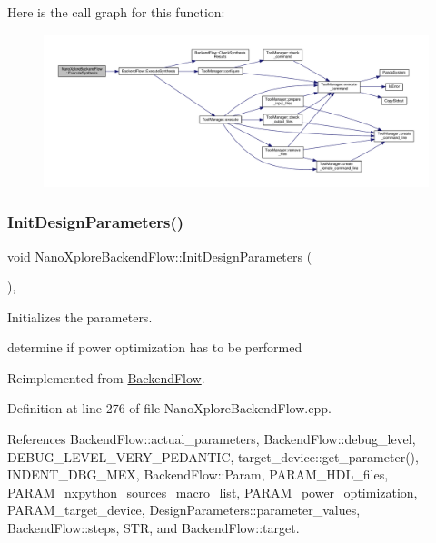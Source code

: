 Here is the call graph for this function\+:
\nopagebreak
\begin{figure}[H]
\begin{center}
\leavevmode
\includegraphics[width=350pt]{d3/d3c/classNanoXploreBackendFlow_a068c9327512c0a9f5524433ebb52fde7_cgraph}
\end{center}
\end{figure}
\mbox{\label{classNanoXploreBackendFlow_a56157c2264c3b823bb2a6cb5d1386d63}} 
\subsubsection{\texorpdfstring{Init\+Design\+Parameters()}{InitDesignParameters()}}
{\footnotesize\ttfamily void Nano\+Xplore\+Backend\+Flow\+::\+Init\+Design\+Parameters (\begin{DoxyParamCaption}{ }\end{DoxyParamCaption})\hspace{0.3cm}{\ttfamily [override]}, {\ttfamily [virtual]}}



Initializes the parameters. 

determine if power optimization has to be performed 

Reimplemented from \hyperlink{classBackendFlow_a367d9917dc257ed6aa0bb5e97f57d2d4}{Backend\+Flow}.



Definition at line 276 of file Nano\+Xplore\+Backend\+Flow.\+cpp.



References Backend\+Flow\+::actual\+\_\+parameters, Backend\+Flow\+::debug\+\_\+level, D\+E\+B\+U\+G\+\_\+\+L\+E\+V\+E\+L\+\_\+\+V\+E\+R\+Y\+\_\+\+P\+E\+D\+A\+N\+T\+IC, target\+\_\+device\+::get\+\_\+parameter(), I\+N\+D\+E\+N\+T\+\_\+\+D\+B\+G\+\_\+\+M\+EX, Backend\+Flow\+::\+Param, P\+A\+R\+A\+M\+\_\+\+H\+D\+L\+\_\+files, P\+A\+R\+A\+M\+\_\+nxpython\+\_\+sources\+\_\+macro\+\_\+list, P\+A\+R\+A\+M\+\_\+power\+\_\+optimization, P\+A\+R\+A\+M\+\_\+target\+\_\+device, Design\+Parameters\+::parameter\+\_\+values, Backend\+Flow\+::steps, S\+TR, and Backend\+Flow\+::target.

